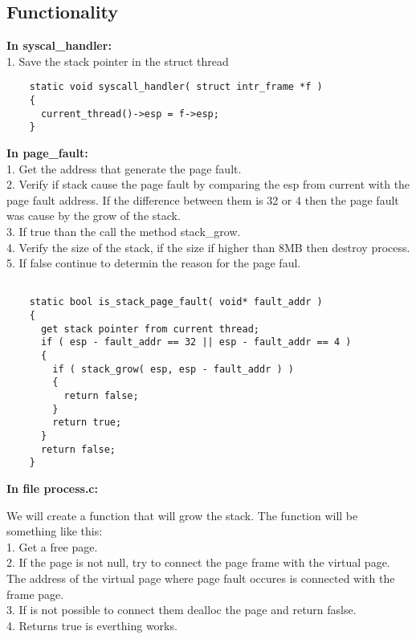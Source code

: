 \subsection{Functionality}
 
\textbf{In syscal\_handler:}
	  \\1. Save the stack pointer in the struct thread

\begin{lstlisting}
	static void syscall_handler( struct intr_frame *f )
	{
	  current_thread()->esp = f->esp;
	}
\end{lstlisting}


\textbf{In page\_fault:}
	  \\1. Get the address that generate the page fault.
	  \\2. Verify if stack cause the page fault by comparing the esp from current with the page fault address. If the difference between them is 32 or 4 then the page fault was cause by the grow of the stack.
	  \\3. If true than the call the method stack\_grow.
	  \\4. Verify the size of the stack, if the size if higher than 8MB then destroy process.
	  \\5. If false continue to determin the reason for the page faul.

\begin{lstlisting}

	static bool is_stack_page_fault( void* fault_addr )
	{
	  get stack pointer from current thread;
	  if ( esp - fault_addr == 32 || esp - fault_addr == 4 )
	  {
	    if ( stack_grow( esp, esp - fault_addr ) )
	    {
	      return false;
	    }
	    return true;
	  }
	  return false;
	}

\end{lstlisting}


\textbf{In file process.c: }

We will create a function that will grow the stack. The function will be something like this:
      \\1. Get a free page. 
      \\2. If the page is not null, try to connect the page frame with the virtual page. The address of the virtual page where page fault occures is connected with the frame page.
      \\3. If is not possible to connect them dealloc the page and return faslse.
      \\4. Returns true is everthing works.

